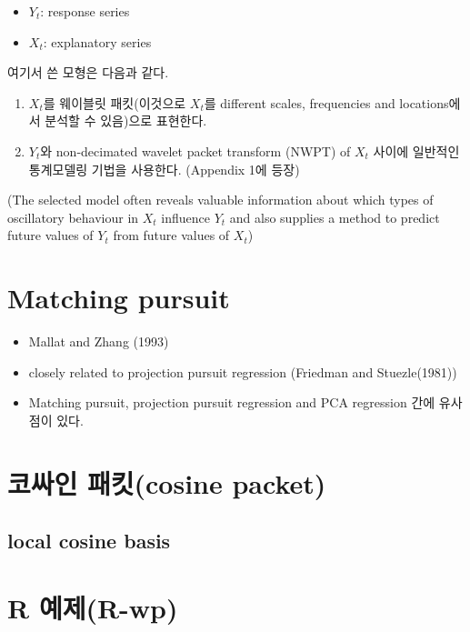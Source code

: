 \documentclass[b5paper,]{book}
\theoremstyle{definition}
\theoremstyle{definition}
\theoremstyle{definition}
\theoremstyle{remark}
\begin{document}
\begin{itemize}
\item
  \(Y_{t}\): response series
\item
  \(X_{t}\): explanatory series
\end{itemize}

여기서 쓴 모형은 다음과 같다.

\begin{enumerate}
\def\labelenumi{\arabic{enumi}.}
\item
  \(X_{t}\)를 웨이블릿 패킷(이것으로 \(X_{t}\)를 different scales,
  frequencies and locations에서 분석할 수 있음)으로 표현한다.
\item
  \(Y_{t}\)와 non-decimated wavelet packet transform (NWPT) of \(X_{t}\)
  사이에 일반적인 통계모델링 기법을 사용한다. (Appendix 1에 등장)
\end{enumerate}

(The selected model often reveals valuable information about which types
of oscillatory behaviour in \(X_{t}\) influence \(Y_{t}\) and also
supplies a method to predict future values of \(Y_{t}\) from future
values of \(X_{t}\))

\section{Matching pursuit}\label{matching-pursuit}

\begin{itemize}
\item
  Mallat and Zhang (1993)
\item
  closely related to projection pursuit regression (Friedman and
  Stuezle(1981))
\item
  Matching pursuit, projection pursuit regression and PCA regression
  간에 유사점이 있다.
\end{itemize}

\section{코싸인 패킷(cosine packet)}\label{-cosine-packet}

\subsection{local cosine basis}\label{local-cosine-basis}

\section{R 예제(R-wp)}\label{r-r-wp}
\end{document}
